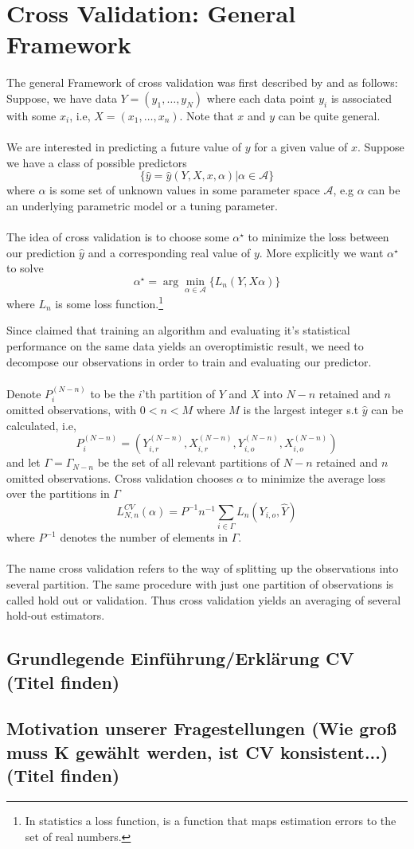 \documentclass[Research_Module_ES.tex]{subfiles}
\begin{document}
\section{Cross Validation: General Framework}
The general Framework of cross validation was first described by \cite{stone1974cross} and  \cite{geisser1975predictive} as follows: \\

Suppose, we have data $Y=(y_1,\ldots,y_N)$ where each data point $y_i$ is associated with some $x_i$, i.e, $X=(x_1,\ldots,x_n)$. Note that $x$ and $y$ can be quite general.\\
\\
We are interested in predicting a future value of $y$ for a given value of $x$. Suppose we have a class of possible predictors 
\[
	\{\hat{y}=\hat{y}(Y,X,x,\alpha)|\alpha\in\mathscr{A}\}
\]
where $\alpha$ is some set of unknown values in some parameter space $\mathscr{A}$, e.g $\alpha$ can be an underlying parametric model or a tuning parameter.\\
\\
The idea of cross validation is to choose some $\alpha^\star$ to minimize the loss between our prediction $\hat{y}$ and a corresponding real value of $y$. More explicitly we want $\alpha^\star$ to solve
\[
	\alpha^\star=\arg\min_{\alpha\in\mathscr{A}}\{L_n(Y,X\alpha)\}
\]
where $L_n$ is some loss function.\footnote{In statistics a loss function, is a function that maps estimation errors to the set of real numbers.  }
 
Since \cite{larson1931shrinkage} claimed that training an algorithm and evaluating it's statistical performance on the same data yields an overoptimistic result, we need to decompose our observations in order to train and evaluating our predictor. \\
\\
Denote $P^{(N-n)}_i$ to be the $i$'th partition of $Y$ and $X$ into $N-n$ retained and $n$ omitted observations, with $0<n<M$ where $M$ is the largest integer s.t $\hat{y}$ can be calculated, i.e,
\[
	P^{(N-n)}_i=(Y_{i,r}^{(N-n)},X_{i,r}^{(N-n)},Y_{i,o}^{(N-n)},X_{i,o}^{(N-n)})
\]
and let $\Gamma=\Gamma_{N-n}$ be the set of all relevant partitions of $N-n$ retained and $n$ omitted observations. Cross validation chooses $\alpha$ to minimize the average loss over the partitions in $\Gamma$ 
\[
	L_{N,n}^{CV}(\alpha)=P^{-1}n^{-1}\sum_{i\in\Gamma}L_n(Y_{i,o},\hat{Y})
\]
where $P^{-1}$ denotes the number of elements in $\Gamma$.\\
\\
The name cross validation refers to the way of splitting up the observations into several partition. The same procedure with just one partition of observations is called hold out or validation. Thus cross validation yields an averaging of several hold-out estimators.







\subsection{Grundlegende Einführung/Erklärung CV (Titel finden)}
\subsection{Motivation unserer Fragestellungen (Wie groß muss K gewählt werden, ist CV konsistent...)(Titel finden)}
\end{document}
